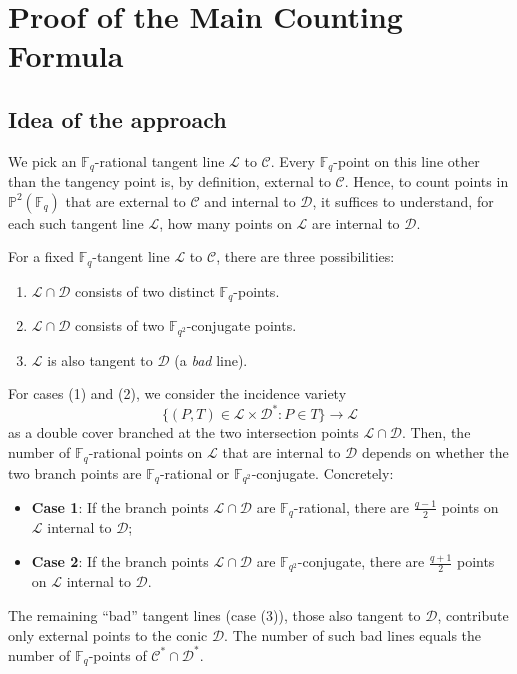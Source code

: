 \documentclass[11pt]{article}
\theoremstyle{definition}
\theoremstyle{definition}
\begin{document}
\section{Proof of the Main Counting Formula}
\subsection*{Idea of the approach}
We pick an \(\mathbb F_q\)-rational tangent line \(\mathcal L\) to \(\mathcal C\).  
Every \(\mathbb F_q\)-point on this line other than the tangency point is, by definition, external to \(\mathcal C\).  
Hence, to count points in \(\mathbb P^2(\mathbb F_q)\) that are external to \(\mathcal C\) and internal to \(\mathcal D\), it suffices to understand, for each such tangent line \(\mathcal L\), how many points on \(\mathcal L\) are internal to \(\mathcal D\).

For a fixed $\mathbb{F}_q$-tangent line \(\mathcal L\) to $\mathcal{C}$, there are three possibilities:
\begin{enumerate}
  \item[\textbf{(1)}] \(\mathcal L\cap\mathcal D\) consists of two distinct \(\mathbb F_q\)-points.
  \item[\textbf{(2)}] \(\mathcal L\cap\mathcal D\) consists of two \(\mathbb F_{q^2}\)-conjugate points.
  \item[\textbf{(3)}] \(\mathcal L\) is also tangent to \(\mathcal D\) (a \emph{bad} line).
\end{enumerate}
For cases (1) and (2), we consider the incidence variety
\begin{equation}\label{eq:incidence} 
\{(P,T)\in \mathcal L\times \mathcal D^* : P\in T\}\to \mathcal L
\end{equation}
as a double cover branched at the two intersection points \(\mathcal L\cap\mathcal D\). Then, the number of $\mathbb{F}_q$-rational points on $\mathcal{L}$ that are internal to $\mathcal{D}$ depends on whether the two branch points are $\mathbb{F}_q$-rational or $\mathbb{F}_{q^2}$-conjugate.
Concretely:
\begin{itemize}
  \item \textbf{Case 1}: If the branch points $\mathcal L\cap \mathcal D$ are \(\mathbb F_q\)-rational, there are \(\tfrac{q-1}{2}\) points on \(\mathcal L\) internal to $\mathcal{D}$;
  \item \textbf{Case 2}: If the branch points $\mathcal L\cap\mathcal D$ are \(\mathbb F_{q^2}\)-conjugate, there are \(\tfrac{q+1}{2}\) points on $\mathcal{L}$ internal to $\mathcal{D}$.
\end{itemize}
The remaining “bad” tangent lines (case (3)), those also tangent to \(\mathcal D\), contribute only external points to the conic \(\mathcal D\). The number of such bad lines equals the number of \(\mathbb F_q\)-points of \(\mathcal C^*\cap\mathcal D^*\).
\end{document}
